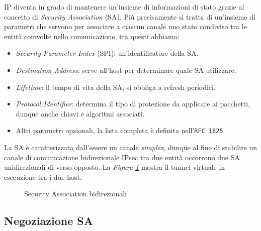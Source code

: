 \noindent 
IP diventa in grado di mantenere un'insieme di informazioni di stato grazie al concetto di \textit{Security Association} (SA).
Più precisamente si tratta di un'insieme di parametri che servono per associare a ciascun canale uno stato condiviso tra le entità coinvolte nello comunicazione,
tra questi abbiamo:

\begin{itemize}
    \item \textit{Security Parameter Index} (SPI): un'identificatore della SA.
    \item \textit{Destination Address}: serve all'host per determinare quale SA utilizzare. 
    \item \textit{Lifetime}: il tempo di vita della SA, si obbliga a refresh periodici.
    \item \textit{Protocol Identifier}: determina il tipo di protezione da applicare ai pacchetti, dunque anche chiavi e algoritmi associati.
    \item Altri parametri opzionali, la lista completa è definita nell'\texttt{RFC 1825}.
\end{itemize}

\noindent
La SA è caratterizzata dall'essere un canale \textit{simplex}, dunque al fine di stabilire un canale di comunicazione bidirezionale IPsec tra due entità occorrono due SA unidirezionali di verso opposto.
La \textit{Figura \ref{fig:sa_bidirezionale}} mostra il tunnel virtuale in esecuzione tra i due host.

\begin{figure}[h!]
    \centering
    \vspace{0.4cm}
    \caption{Security Association bidirezionali}
    \label{fig:sa_bidirezionale}
\end{figure}

\noindent

\subsection{Negoziazione SA}

